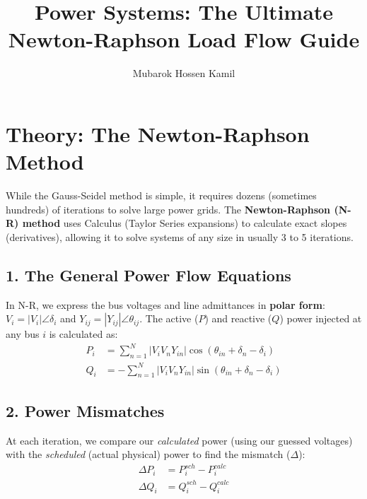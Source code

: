 \documentclass[11pt]{article}
\begin{document}
\title{\textbf{Power Systems: The Ultimate Newton-Raphson Load Flow Guide}}
\author{Mubarok Hossen Kamil}
\date{}
\maketitle

\section*{\textcolor{mainblue}{Theory: The Newton-Raphson Method}}

While the Gauss-Seidel method is simple, it requires dozens (sometimes hundreds) of iterations to solve large power grids. The \textbf{Newton-Raphson (N-R) method} uses Calculus (Taylor Series expansions) to calculate exact slopes (derivatives), allowing it to solve systems of any size in usually 3 to 5 iterations.

\subsection*{1. The General Power Flow Equations}
In N-R, we express the bus voltages and line admittances in \textbf{polar form}: $V_i = |V_i|\angle\delta_i$ and $Y_{ij} = |Y_{ij}|\angle\theta_{ij}$. The active ($P$) and reactive ($Q$) power injected at any bus $i$ is calculated as:
\begin{align}
    P_i &= \sum_{n=1}^{N} |V_i V_n Y_{in}| \cos(\theta_{in} + \delta_n - \delta_i) \label{eq:P_theory} \\
    Q_i &= -\sum_{n=1}^{N} |V_i V_n Y_{in}| \sin(\theta_{in} + \delta_n - \delta_i) \label{eq:Q_theory}
\end{align}

\subsection*{2. Power Mismatches}
At each iteration, we compare our \textit{calculated} power (using our guessed voltages) with the \textit{scheduled} (actual physical) power to find the mismatch ($\Delta$):
\begin{align*}
    \Delta P_i &= P_i^{sch} - P_i^{calc} \\
    \Delta Q_i &= Q_i^{sch} - Q_i^{calc}
\end{align*}
\end{document}
